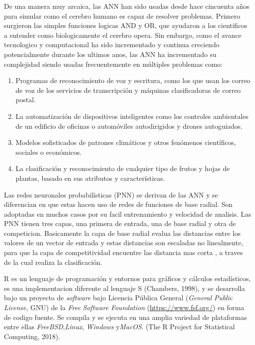 De una manera muy arcaica, las ANN han sido usadas desde hace cincuenta años para simular como el cerebro humano es capaz de resolver problemas. Primero surgieron las simples funciones logicas AND y OR, que ayudaron a los cientificos a entender como biologicamente el cerebro opera. Sin embargo, como el avance tecnologico y computacional ha sido incrementado y continua creciendo potencialmente durante los ultimos anos, las ANN ha incrementado su complejidad siendo usadas frecuentemente en múltiples problemas como:

\begin{enumerate}
    \item{Programas de reconocimiento de voz y escritura, como los que usan los correo de voz
de los servicios de transcripción y máquinas clasificadoras de correo postal.}
	\item{La automatización de dispositivos inteligentes como los controles ambientales de un edificio de oficinas o automóviles autodirigidos y drones autoguiados.}
	\item{Modelos sofisticados de patrones climáticos y otros fenómenos científicos, sociales o económicos.}
	\item{La clasificaci\'on y reconocimiento de cualquier tipo de frutos y hojas de plantas, basado en sus atributos y características.}
\end{enumerate} 

Las redes neuronales probabil\'isticas (PNN) se derivan de las ANN y se diferencian en que estas hacen uso de redes de funciones de base radial. Son adoptadas en muchos casos por su facil entrenamiento y velocidad de analisis. Las PNN tienen tres capas, una primera de entrada, una de base radial y otra de competicion. Basicamente la capa de base radial evalua las distancias entre los valores de un vector de entrada y estas distancias son escaladas no linealmente, para que la capa de competitividad encuentre las distancia mas corta , a traves de la cual realiza la clasificaci\'on.

R es un lenguaje de programación y entornos para gráficos y c\'alculos estad\'isticos, es una implementacion diferente al lenguaje S (Chambers, 1998), y se desarrolla bajo un proyecto de \textit{software} bajo Licencia Pública General (\textit{General Public License}, GNU) de la \textit{Free Software Foundation} (\url{https://www.fsf.org/}) en forma de codigo fuente. Se compila y se ejecuta en una amplia variedad de plataformas entre ellas \textit{FreeBSD},\textit{Linux}, \textit{Windows} y\textit{MacOS}. (The R Project for Statistical Computing, 2018).\\

